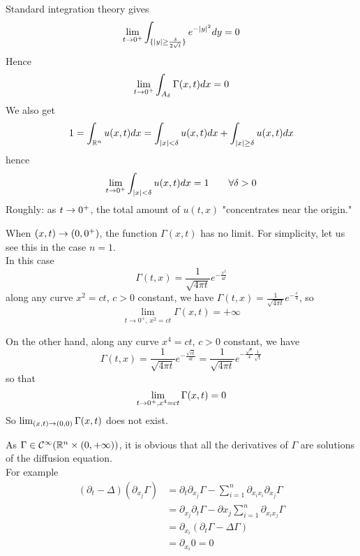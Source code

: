 Standard integration theory gives 
\begin{equation*}
    \lim_{t \rightarrow 0^+}\int _{\{|y| \geq \frac{\delta}{2 \sqrt{t}}\}} e ^{- |y|^2} dy =0
\end{equation*}
Hence 
\begin{equation*}
    \lim_{t \rightarrow 0^+} \int_{A_\delta}\Gamma(x,t)dx=0
\end{equation*}
We also get 
\begin{equation*}
    1 = \int_{\mathbb{R}^n} u(x,t)dx = \int_{|x|< \delta} u(x,t)dx+\int_{|x|\geq \delta} u(x,t)dx
\end{equation*}
hence 
\begin{equation*}
    \lim_{t \rightarrow 0^+}\int_{|x|< \delta}u(x,t)dx=1 \qquad \forall \delta >0
\end{equation*}
Roughly: as \( t \rightarrow 0^+ \), the total amount of \( u(t,x) \) "concentrates near the origin." 

When \((x,t) \rightarrow (0,0^+)\), the function \( \Gamma(x,t) \) has no limit. For simplicity, let us see this in the case \( n = 1 \).\\
In this case
\[
\Gamma(t,x) =  \frac{1}{\sqrt{4\pi t}} e^{-\frac{x^2}{4t}}
\]
along any curve $x^2= ct$, $c>0$ constant, we have $\Gamma(t,x) =  \frac{1}{\sqrt{4\pi t}} e^{-\frac{c}{4}}$, so 
\begin{equation*}
    \lim_{t \rightarrow 0^+, \,x^2 = ct}\Gamma(x,t)= +\infty
\end{equation*}

On the other hand, along any curve $x^4= ct$, $c>0$ constant, we have \[\Gamma(t,x) =  \frac{1}{\sqrt{4\pi t}} e^{-\frac{\sqrt{ct}}{4t}} = \frac{1}{\sqrt{4 \pi t}}e^{-\frac{\sqrt{c}}{4}\frac{1}{\sqrt{t}}}\]so that 
\begin{equation*}
    \lim_{t \rightarrow 0^+, x^4 = ct } \Gamma(x,t)= 0
\end{equation*}
So $ \lim_{(x,t)\rightarrow(0,0)}\Gamma(x,t)$ does not exist.
\begin{remark}
    As $\Gamma \in \mathcal{C}^{\infty}(\mathbb{R}^n \times (0,+\infty))$, it is obvious that all the derivatives of $\Gamma$ are solutions of the diffusion equation. \\
    For example 
    \begin{align*}
        (\partial_t - \Delta)(\partial_{x_j}\Gamma) &= \partial_t \partial_{x_j} \Gamma - \sum_{i=1}^n \partial_{x_ix_i} \partial_{x_j} \Gamma \\
        &= \partial_{x_j} \partial_t \Gamma - \partial x_j \sum_{i=1}^n \partial_{x_i x_j} \Gamma \\
        &= \partial_{x_i}(\partial_t \Gamma - \Delta \Gamma) \\
        &= \partial_{x_i} 0 = 0
    \end{align*}
\end{remark}

